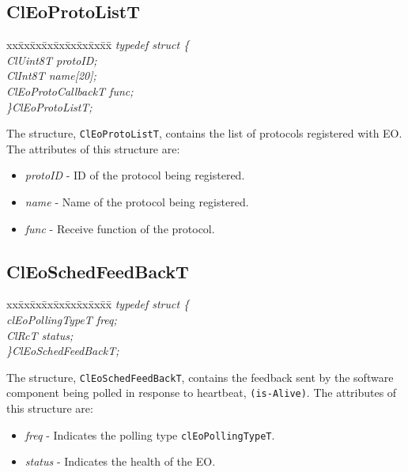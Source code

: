 \begin{flushleft}
\subsection{ClEoProtoListT}
\begin{tabbing}
xx\=xx\=xx\=xx\=xx\=xx\=xx\=xx\=xx\=\kill
\textit{typedef struct \{}\\
\>\>\>\textit{ClUint8T            protoID;}\\
\>\>\>\textit{ClInt8T             name[20];}\\
\>\>\>\textit{ClEoProtoCallbackT   func;}\\
\textit{\}ClEoProtoListT;}
\end{tabbing}
The structure, {\tt{ClEoProtoListT}}, contains the list of protocols registered with EO. The attributes of this structure are:
\begin{itemize}
\item
\textit{protoID} - ID of the protocol being registered.
\item
\textit{name} - Name of the protocol being registered.
\item
\textit{func} - Receive function of the protocol.
\end{itemize}



\subsection{ClEoSchedFeedBackT}
\begin{tabbing}
xx\=xx\=xx\=xx\=xx\=xx\=xx\=xx\=xx\=\kill
\textit{typedef struct \{}\\
\>\>\>\textit{clEoPollingTypeT   freq;}\\
\>\>\>\textit{ClRcT              status;}\\
\textit{\}ClEoSchedFeedBackT;}
\end{tabbing}
The structure, {\tt{ClEoSchedFeedBackT}}, contains the feedback sent by the software component being polled in response to
heartbeat, {\tt{(is-Alive)}}. The attributes of this structure are:
\begin{itemize}
 \item
 \textit{freq} - Indicates the polling type {\tt{clEoPollingTypeT}}.
 \item
 \textit{status} - Indicates the health of the EO.
 \end{itemize}



\end{flushleft}
